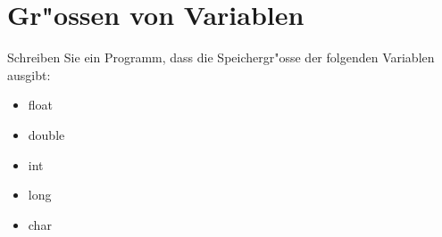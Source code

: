 \documentclass[a4paper,10pt]{article}
\begin{document}
\section{Gr"ossen von Variablen}
Schreiben Sie ein Programm, dass die Speichergr"osse der folgenden Variablen ausgibt:

\begin{itemize}
\item float
\item double
\item int
\item long
\item char
\end{itemize}
\end{document}
